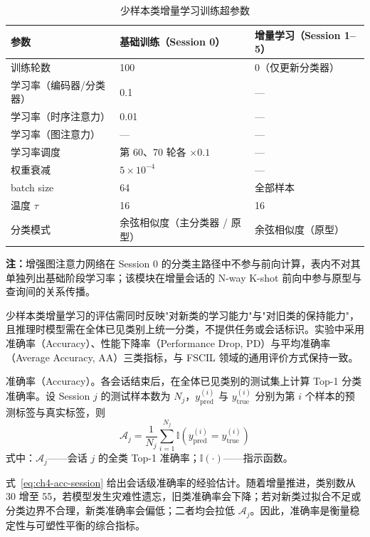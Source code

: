 \begin{table}[h]
  \caption{少样本类增量学习训练超参数}
  \label{tab:fscil-hyperparams}
  \begin{tabularx}{\textwidth}{XXX}
  \toprule
  参数 & 基础训练（Session 0） & 增量学习（Session 1–5） \\
  \midrule
  训练轮数 & 100 & 0（仅更新分类器） \\
  学习率（编码器/分类器） & 0.1 & — \\
  学习率（时序注意力） & 0.01 & — \\
  学习率（图注意力） & — & — \\
  学习率调度 & 第 60、70 轮各 $\times 0.1$ & — \\
  权重衰减 & $5 \times 10^{-4}$ & — \\
  batch size & 64 & 全部样本 \\
  温度 $\tau$ & 16 & 16 \\
  分类模式 & 余弦相似度（主分类器 / 原型） & 余弦相似度（原型） \\
  \bottomrule
  \end{tabularx}
  \vspace{0.35em}
  \noindent\footnotesize\textbf{注：}增强图注意力网络在 Session 0 的分类主路径中不参与前向计算，表内不对其单独列出基础阶段学习率；该模块在增量会话的 N-way K-shot 前向中参与原型与查询间的关系传播。
\end{table}


少样本类增量学习的评估需同时反映"对新类的学习能力"与"对旧类的保持能力"，且推理时模型需在全体已见类别上统一分类，不提供任务或会话标识。实验中采用准确率（Accuracy）、性能下降率（Performance Drop, PD）与平均准确率（Average Accuracy, AA）三类指标\cite{tian2024fscilsurvey}，与 FSCIL 领域的通用评价方式保持一致。

准确率（Accuracy）。各会话结束后，在全体已见类别的测试集上计算 Top-1 分类准确率。设 Session $j$ 的测试样本数为 $N_j$，$y_{\mathrm{pred}}^{(i)}$ 与 $y_{\mathrm{true}}^{(i)}$ 分别为第 $i$ 个样本的预测标签与真实标签，则
\begin{equation}\label{eq:ch4-acc-session}
  \mathcal{A}_j = \frac{1}{N_j} \sum_{i=1}^{N_j} \mathbb{I}\left( y_{\mathrm{pred}}^{(i)} = y_{\mathrm{true}}^{(i)} \right)
\end{equation}
\noindent 式中：$\mathcal{A}_j$——会话 $j$ 的全类 Top-1 准确率；$\mathbb{I}(\cdot)$——指示函数。

式~\eqref{eq:ch4-acc-session} 给出会话级准确率的经验估计。随着增量推进，类别数从 30 增至 55，若模型发生灾难性遗忘，旧类准确率会下降；若对新类过拟合不足或分类边界不合理，新类准确率会偏低；二者均会拉低 $\mathcal{A}_j$。因此，准确率是衡量稳定性与可塑性平衡的综合指标。

